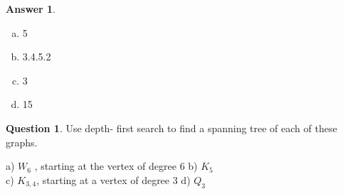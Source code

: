 \documentclass[article, 12pt]{article}
\theoremstyle{definition}
\newtheorem{question}{Question}
\newtheorem{answer}{Answer}
\begin{document}
    \begin{answer} \
        \label{a3}
        \begin{enumerate}[a)]
            \item 5
            \item 3.4.5.2
            \item 3
            \item 15
        \end{enumerate}
    \end{answer}

    \begin{question}
        \label{q4}
        Use depth- first search to find a spanning tree of each of these graphs. 

        a) $W_6$ , starting at the vertex of degree 6\hskip 2cm b) $K_5$ \\ c) $K_{3,4}$, starting at a vertex of degree 3 \hskip2.2cm d) $Q_3$
    \end{question}
\end{document}
